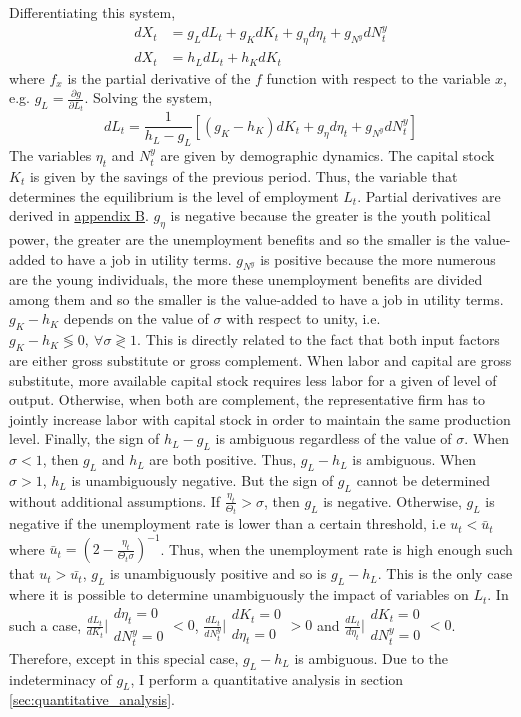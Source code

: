 Differentiating this system,
	\begin{align*}
		dX_t &= g_L dL_t + g_K dK_t + g_\eta d\eta_t + g_{N^y} dN_t^y \\
		dX_t &= h_L dL_t + h_K dK_t
	\end{align*}
where $f_x$ is the partial derivative of the $f$ function with respect to the variable $x$, e.g. $g_L = \frac{\partial g}{\partial L_t}$. Solving the system,
	\begin{equation*}
		dL_t = \frac{1}{h_L-g_L}\left[(g_K-h_K) dK_t + g_\eta d\eta_t + g_{N^y} dN_t^y \right]
	\end{equation*}
The variables $\eta_t$ and $N_t^y$ are given by demographic dynamics. The capital stock $K_t$ is given by the savings of the previous period. Thus, the variable that determines the equilibrium is the level of employment $L_t$. Partial derivatives are derived in \hyperref[appendix:derivatives]{appendix B}. $g_\eta$ is negative because the greater is the youth political power, the greater are the unemployment benefits and so the smaller is the value-added to have a job in utility terms. $g_{N^y}$ is positive because the more numerous are the young individuals, the more these unemployment benefits are divided among them and so the smaller is the value-added to have a job in utility terms. $g_K-h_K$ depends on the value of $\sigma$ with respect to unity, i.e. $g_K-h_K \lessgtr 0, ~ \forall \sigma \gtrless 1$. This is directly related to the fact that both input factors are either gross substitute or gross complement. When labor and capital are gross substitute, more available capital stock requires less labor for a given of level of output. Otherwise, when both are complement, the representative firm has to jointly increase labor with capital stock in order to maintain the same production level. Finally, the sign of $h_L-g_L$ is ambiguous regardless of the value of $\sigma$. When $\sigma < 1$, then $g_L$ and $h_L$ are both positive. Thus, $g_L-h_L$ is ambiguous. When $\sigma > 1$, $h_L$ is unambiguously negative. But the sign of $g_L$ cannot be determined without additional assumptions. If $\frac{\eta_t}{\Theta_t} > \sigma$, then $g_L$ is negative. Otherwise, $g_L$ is negative if the unemployment rate is lower than a certain threshold, i.e $u_t < \bar{u}_t$ where $\bar{u}_t = \left(2 - \frac{\eta_t}{\Theta_t\sigma}\right)^{-1}$. Thus, when the unemployment rate is high enough such that $u_t > \bar{u_t}$, $g_L$ is unambiguously positive and so is $g_L-h_L$. This is the only case where it is possible to determine unambiguously the impact of variables on $L_t$. In such a case, $\frac{dL_t}{dK_t}\Bigr|{\substack{d\eta_t = 0\\dN_t^y = 0}} < 0$, $\frac{dL_t}{dN^y_t}\Bigr|{\substack{dK_t = 0\\d\eta_t = 0}} > 0$ and $\frac{dL_t}{d\eta_t}\Bigr|{\substack{dK_t = 0\\dN_t^y = 0}} < 0$. Therefore, except in this special case, $g_L-h_L$ is ambiguous. Due to the indeterminacy of $g_L$, I perform a quantitative analysis in section \ref{sec:quantitative_analysis}.